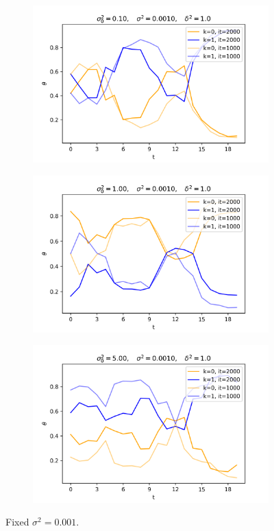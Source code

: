 \documentclass[12pt]{article}
\begin{document}
\begin{figure}[H]
  \begin{subfigure}[b]{0.33\textwidth}
    \includegraphics[width=\linewidth]{init_1E-01|basic_1E-03|prop_1E+00|it_2000|autoreg_True}
  \end{subfigure}%
  \begin{subfigure}[b]{0.33\textwidth}
    \includegraphics[width=\linewidth]{init_1E+00|basic_1E-03|prop_1E+00|it_2000|autoreg_True}
  \end{subfigure}%
  \begin{subfigure}[b]{0.33\textwidth}
    \includegraphics[width=\linewidth]{init_5E+00|basic_1E-03|prop_1E+00|it_2000|autoreg_True}
  \end{subfigure}
  \caption{Fixed $\sigma^2=0.001$.}
\end{figure}
\end{document}
